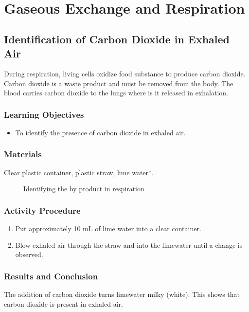\section{Gaseous Exchange and Respiration}

\subsection{Identification of Carbon Dioxide in Exhaled Air}

During respiration, living cells oxidize food substance to produce carbon dioxide. Carbon dioxide is a waste product and must be removed from the body. The blood carries carbon dioxide to the lungs where is it released in exhalation.

\subsubsection*{Learning Objectives}
\begin{itemize}
\item{To identify the presence of carbon dioxide in exhaled air.}
\end{itemize}

\subsubsection*{Materials}
Clear plastic container, plastic straw, lime water*.

\begin{figure}
\begin{center}
\def\svgwidth{2cm}

\caption{Identifying the by product  in respiration}
\label{fig:CO2-limewater}
\end{center}
\end{figure}

\subsubsection*{Activity Procedure}
\begin{enumerate}
\item{Put approximately 10 mL of lime water into a clear container.}
\item{Blow exhaled air through the straw and into the limewater until a change is observed.}
\end{enumerate}

\subsubsection*{Results and Conclusion}
The addition of carbon dioxide turns limewater milky (white). This shows that carbon dioxide is present in exhaled air.

